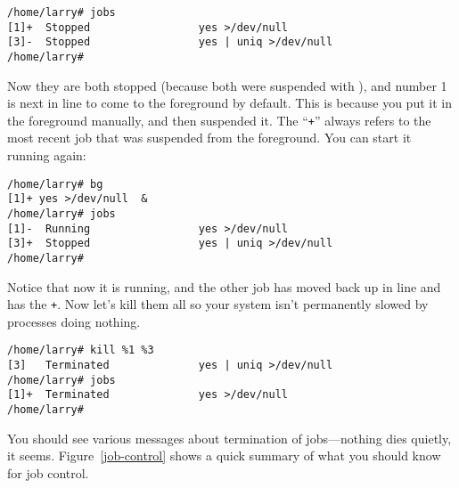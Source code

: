 \begin{screen}\begin{verbatim}
/home/larry# jobs
[1]+  Stopped                 yes >/dev/null
[3]-  Stopped                 yes | uniq >/dev/null
/home/larry#
\end{verbatim}
\end{screen}
        
Now they are both stopped (because both were suspended with
), and number 1 is next in line to come to the foreground
by default.  This is because you put it in the foreground manually,
and then suspended it.  The ``{\tt +}'' always refers to the most
recent job that was suspended from the foreground.  You can start it
running again:

\begin{screen}\begin{verbatim}
/home/larry# bg
[1]+ yes >/dev/null  &
/home/larry# jobs
[1]-  Running                 yes >/dev/null  
[3]+  Stopped                 yes | uniq >/dev/null
/home/larry#
\end{verbatim}
\end{screen}
        
Notice that now it is running, and the other job has moved back up in
line and has the {\tt +}.  Now let's kill them all so your system
isn't permanently slowed by processes doing nothing.

\begin{screen}\begin{verbatim}
/home/larry# kill %1 %3
[3]   Terminated              yes | uniq >/dev/null 
/home/larry# jobs
[1]+  Terminated              yes >/dev/null 
/home/larry#
\end{verbatim}
\end{screen}

You should see various messages about termination of jobs---nothing
dies quietly, it seems.  Figure~\vref{job-control} shows a quick
summary of what you should know for job control.

